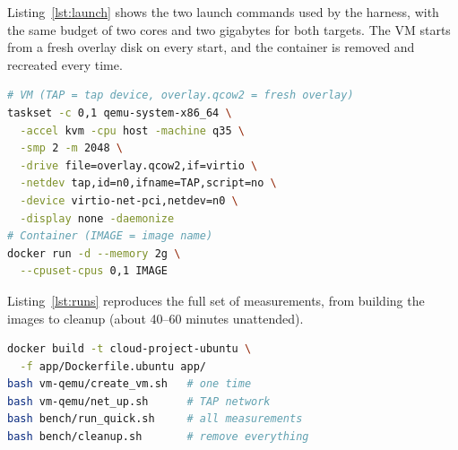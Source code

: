 \documentclass[conference,a4paper]{IEEEtran}
\begin{document}
Listing~\ref{lst:launch} shows the two launch commands used by the harness, with the same budget of two cores and two gigabytes for both targets. The VM starts from a fresh overlay disk on every start, and the container is removed and recreated every time.

\begin{lstlisting}[language=bash, caption={Launch commands used by the harness (simplified)}, label={lst:launch}]
# VM (TAP = tap device, overlay.qcow2 = fresh overlay)
taskset -c 0,1 qemu-system-x86_64 \
  -accel kvm -cpu host -machine q35 \
  -smp 2 -m 2048 \
  -drive file=overlay.qcow2,if=virtio \
  -netdev tap,id=n0,ifname=TAP,script=no \
  -device virtio-net-pci,netdev=n0 \
  -display none -daemonize
# Container (IMAGE = image name)
docker run -d --memory 2g \
  --cpuset-cpus 0,1 IMAGE
\end{lstlisting}

Listing~\ref{lst:runs} reproduces the full set of measurements, from building the images to cleanup (about 40--60 minutes unattended).

\begin{lstlisting}[language=bash, caption={Reproducing all measurements}, label={lst:runs}]
docker build -t cloud-project-ubuntu \
  -f app/Dockerfile.ubuntu app/
bash vm-qemu/create_vm.sh   # one time
bash vm-qemu/net_up.sh      # TAP network
bash bench/run_quick.sh     # all measurements
bash bench/cleanup.sh       # remove everything
\end{lstlisting}
\end{document}
